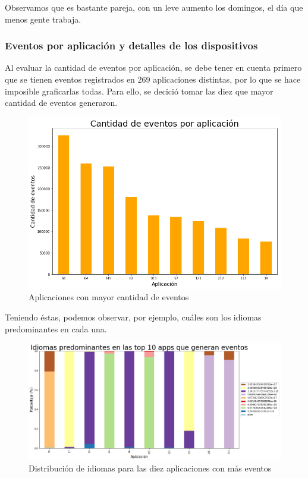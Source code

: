 \documentclass[a4paper, 12pt]{article}
\begin{document}
		Observamos que es bastante pareja, con un leve aumento los domingos, el día que menos gente trabaja.
		
	\subsubsection{Eventos por aplicación y detalles de los dispositivos}
	
		Al evaluar la cantidad de eventos por aplicación, se debe tener en cuenta primero que se tienen eventos registrados en 269 aplicaciones distintas, por lo que se hace imposible graficarlas todas. Para ello, se decició tomar las diez que mayor cantidad de eventos generaron.
		
		\FloatBarrier
		\begin{figure}[h]
			\centering
			\includegraphics[width=\textwidth]{images/events/evxapp.png}
			\caption{Aplicaciones con mayor cantidad de eventos}
		\end{figure}
		\FloatBarrier
		
		Teniendo éstas, podemos observar, por ejemplo, cuáles son los idiomas predominantes en cada una.
		
		\FloatBarrier
		\begin{figure}[h]
			\centering
			\includegraphics[width=\textwidth]{images/events/idiomasapps.png}
			\caption{Distribución de idiomas para las diez aplicaciones con más eventos}
		\end{figure}
		\FloatBarrier
		
\end{document}

